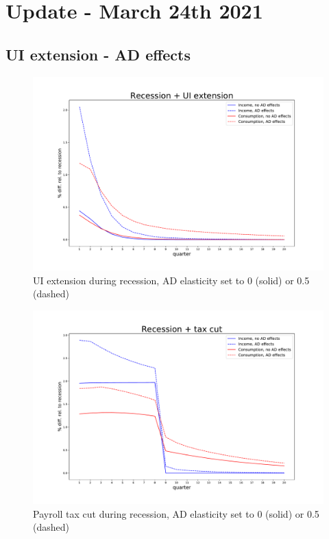 \documentclass[]{article}
\begin{document}
\section{Update - March 24th 2021}

\FloatBarrier
\subsection{UI extension - AD effects}



\begin{figure}[h]
	\centering
	\includegraphics[width=0.7\linewidth]{../UI_AD05_new/recession_UI_relrecession}
	\caption{UI extension during recession, AD elasticity set to 0 (solid) or 0.5 (dashed)}
	\label{fig:recessionuirelrecession}
\end{figure}

\begin{figure}[h]
	\centering
	\includegraphics[width=0.7\linewidth]{../Full_Run_Mar5/recession_taxcut_relrecession}
	\caption{Payroll tax cut during recession, AD elasticity set to 0 (solid) or 0.5 (dashed)}
	\label{fig:recessiontaxcutrelrecession_statedep}
\end{figure}
\end{document}
